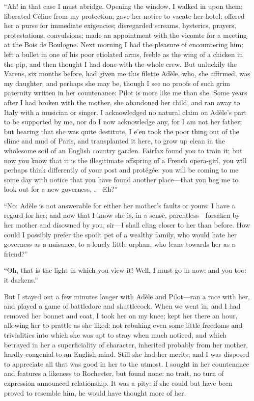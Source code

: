 \enquote{Ah! in that case I must abridge. Opening the window, I walked
in upon them; liberated Céline from my protection; gave her notice to
vacate her hotel; offered her a purse for immediate exigencies;
disregarded screams, hysterics, prayers, protestations, convulsions;
made an appointment with the vicomte for a meeting at the Bois de
Boulogne. Next morning I had the pleasure of encountering him; left a
bullet in one of his poor etiolated arms, feeble as the wing of a
chicken in the pip, and then thought I had done with the whole crew. 
But unluckily the Varens, six months before, had given me this filette
Adèle, who, she affirmed, was my daughter; and perhaps she may be,
though I see no proofs of such grim paternity written in her
countenance: Pilot is more like me than she. Some years after I had
broken with the mother, she abandoned her child, and ran away to Italy
with a musician or singer. I acknowledged no natural claim on Adèle's
part to be supported by me, nor do I now acknowledge any, for I am not
her father; but hearing that she was quite destitute, I e'en took the
poor thing out of the slime and mud of Paris, and transplanted it here,
to grow up clean in the wholesome soil of an English country garden. 
\Mrs{} Fairfax found you to train it; but now you know that it is the
illegitimate offspring of a French opera-girl, you will perhaps think
differently of your post and protégée: you will be coming to me some day
with notice that you have found another place---that you beg me to look
out for a new governess, \etc.---Eh?}

\enquote{No: Adèle is not answerable for either her mother's faults or
yours: I have a regard for her; and now that I know she is, in a sense,
parentless---forsaken by her mother and disowned by you, sir---I shall
cling closer to her than before. How could I possibly prefer the spoilt
pet of a wealthy family, who would hate her governess as a nuisance, to
a lonely little orphan, who leans towards her as a friend?}

\enquote{Oh, that is the light in which you view it! Well, I must go in
now; and you too: it darkens.}

But I stayed out a few minutes longer with Adèle and Pilot---ran a race
with her, and played a game of battledore and shuttlecock. When we went
in, and I had removed her bonnet and coat, I took her on my knee; kept
her there an hour, allowing her to prattle as she liked: not rebuking
even some little freedoms and trivialities into which she was apt to
stray when much noticed, and which betrayed in her a superficiality of
character, inherited probably from her mother, hardly congenial to an
English mind. Still she had her merits; and I was disposed to
appreciate all that was good in her to the utmost. I sought in her
countenance and features a likeness to \Mr{} Rochester, but found none: no
trait, no turn of expression announced relationship. It was a pity: if
she could but have been proved to resemble him, he would have thought
more of her.

